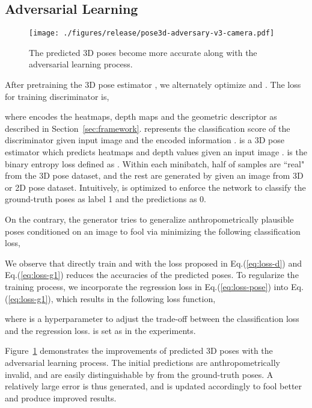 \documentclass[10pt,twocolumn,letterpaper]{article}
\begin{document}
\subsection{Adversarial Learning} 

\begin{figure}[t]
	\begin{center}
		\texttt{[image: ./figures/release/pose3d-adversary-v3-camera.pdf]}
	\end{center}
	\caption{The predicted 3D poses become more accurate along with the adversarial learning process.}
	\label{fig:pose3d-adversary}
\end{figure}

After pretraining the 3D pose estimator , we alternately optimize  and . 
The loss for training discriminator  is, 
{\small

}
\!\!\!\!where  encodes the heatmaps, depth maps and the geometric descriptor as described in Section~\ref{sec:framework}. 
 represents the classification score of the discriminator given input image  and the encoded information  . 
 is a 3D pose estimator which predicts heatmaps  and depth values  given an input image . 
 is the binary entropy loss defined as . 
Within each minibatch, half of samples are ``real" from the 3D pose dataset, and the rest  are generated by
 given an image  from 3D or 2D pose dataset. 
Intuitively,  is optimized to enforce the network  to classify the ground-truth poses as label 1 and the predictions as 0. 

On the contrary, the generator  tries to generalize anthropometrically plausible poses conditioned on an image to fool  via minimizing the following classification loss,

We observe that directly train  and  with the loss proposed in Eq.(\ref{eq:loss-d}) and Eq.(\ref{eq:loss-g1}) reduces the accuracies of the predicted poses. 
To regularize the training process, we incorporate the regression loss  in Eq.(\ref{eq:loss-pose}) into Eq.(\ref{eq:loss-g1}), which results in the following loss function,

where  is a hyperparameter to adjust the trade-off between the classification loss and the regression loss. 
 is set as  in the experiments. 


Figure~\ref{fig:pose3d-adversary} demonstrates the improvements of predicted 3D poses with the adversarial learning process. 
The initial predictions are anthropometrically invalid, and are easily distinguishable by  from the ground-truth poses. 
A relatively large error  is thus generated, and  is updated accordingly to fool  better and produce improved results. 
\end{document}
